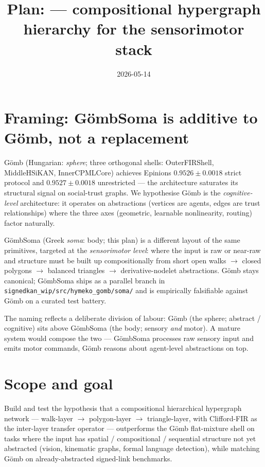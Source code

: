 \documentclass[11pt,a4paper]{article}
\title{Plan: \Soma{} --- compositional hypergraph hierarchy for the sensorimotor stack}
\date{2026-05-14}
\author{}
\newcommand{\Gomb}{G\"omb}
\newcommand{\Soma}{G\"ombSoma}
\begin{document}
\maketitle

\section{Framing: \Soma{} is additive to \Gomb, not a replacement}

\Gomb{} (Hungarian: \emph{sphere}; three orthogonal shells:
OuterFIRShell, MiddleHSiKAN, InnerCPMLCore) achieves Epinions
$0.9526 \pm 0.0018$ strict protocol and $0.9527 \pm 0.0018$
unrestricted --- the architecture saturates its structural signal
on social-trust graphs. We hypothesise \Gomb{} is the
\emph{cognitive-level} architecture: it operates on abstractions
(vertices are agents, edges are trust relationships) where the
three axes (geometric, learnable nonlinearity, routing) factor
naturally.

\Soma{} (Greek \emph{soma}: body; this plan) is a different
layout of the same primitives, targeted at the \emph{sensorimotor
level}: where the input is raw or near-raw and structure must be
built up compositionally from short open walks $\to$ closed
polygons $\to$ balanced triangles $\to$ derivative-nodelet
abstractions. \Gomb{} stays canonical; \Soma{} ships as a parallel
branch in \texttt{signedkan\_wip/src/hymeko\_gomb/soma/} and is
empirically falsifiable against \Gomb{} on a curated test battery.

The naming reflects a deliberate division of labour: \Gomb{} (the
sphere; abstract / cognitive) sits above \Soma{} (the body;
sensory \emph{and} motor). A mature system would compose the two
--- \Soma{} processes raw sensory input and emits motor commands,
\Gomb{} reasons about agent-level abstractions on top.

\section{Scope and goal}

Build and test the hypothesis that a compositional hierarchical
hypergraph network --- walk-layer $\to$ polygon-layer $\to$
triangle-layer, with Clifford-FIR as the inter-layer transfer
operator --- outperforms the \Gomb{} flat-mixture shell on tasks
where the input has spatial / compositional / sequential
structure not yet abstracted (vision, kinematic graphs, formal
language detection), while matching \Gomb{} on already-abstracted
signed-link benchmarks.
\end{document}
